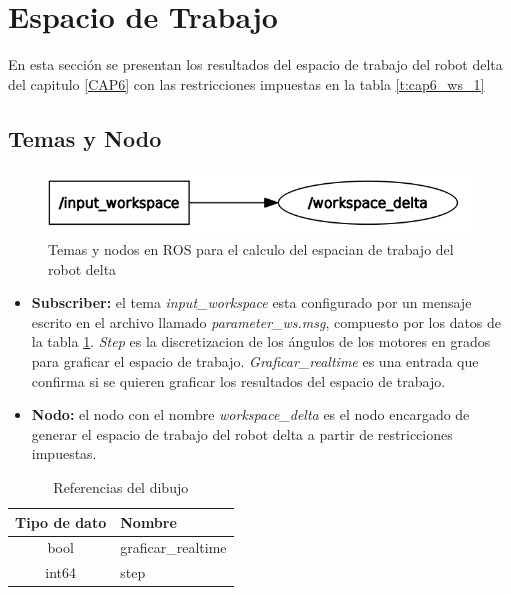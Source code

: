 \newpage


\section{Espacio de Trabajo}
        En esta sección se presentan los resultados del espacio de trabajo del robot delta del capitulo \ref{CAP6} con las restricciones impuestas en la tabla \ref{t:cap6_ws_1}
        
    \subsection{Temas y Nodo}
    
        \begin{figure}[h]
            \centering
            \includegraphics[width=1.0\linewidth]{Main/Chapter7/Images7/nodo_2.png}
            \caption{Temas y nodos en ROS para el calculo del espacian de trabajo del robot delta}
            \label{f:cap7_rviz2222}
        \end{figure}    
    
    \begin{itemize}
        \item {\textbf{Subscriber:}  el tema \textit{input\_workspace} esta configurado por un mensaje escrito en el archivo llamado \textit{parameter\_ws.msg}, compuesto por los datos de la tabla \ref{tab:cap6_rviz_4_msg}. \textit{Step} es la discretizacion de los ángulos de los motores en grados para graficar el espacio de trabajo. \textit{Graficar\_realtime} es una entrada que confirma si se quieren graficar los resultados del espacio de trabajo. }
        \item {\textbf{Nodo:} el nodo con el nombre \textit{workspace\_delta} es el nodo encargado de generar el espacio de trabajo del robot delta a partir de restricciones impuestas.}
    \end{itemize}
    
        
            \begingroup
            \renewcommand{\arraystretch}{2.0}
            \begin{table}[H]
                \centering
                \begin{tabular}{c m{3.0cm}}
                   \hline                   
                   \textbf{Tipo de dato}  & \textbf{Nombre}    \\\hline \hline 
                    bool & graficar\_realtime
                   \\\hline
                    int64 & step
                    \\\hline                   
                \end{tabular}
                \caption{Referencias del dibujo}
                \label{tab:cap6_rviz_4_msg}
            \end{table}
        \endgroup    
        
